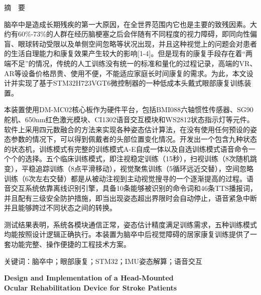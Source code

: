 
\begin{center}
{\heiti \husttitle}
\end{center}

\vskip 14pt

\begin{center}
{\heiti 摘\ \ 要}
\end{center}

\vskip 14pt

{\songti
脑卒中是造成长期残疾的第一大原因，在全世界范围内它也是主要的致残因素。大约有60\%-73\%的人群在经历脑梗塞之后会伴随有不同程度的视力障碍，即同向性偏盲、眼球转动受限以及单侧空间忽略等状况出现，并且这种视觉上的问题会对患者的生活自理能力和康复效果产生较大的影响[1-4]。但是现有的康复手段存在着“两端不足”的情况，传统的人工训练没有统一的标准和量化的过程记录，高端的VR、AR等设备价格昂贵、使用不便，不能适应家庭长时间康复的需求。为此，本文设计并实现了基于STM32H723VGT6微控制器的一种低成本头戴式眼部康复训练装置。

本装置使用DM-MC02核心板作为硬件平台，包括BMI088六轴惯性传感器、SG90舵机、650nm红色激光模块、CI1302语音交互模块和WS2812状态指示灯等元件。软件上采用四元数融合的方法来实现各种姿态估计算法，在没有使用任何预设的姿态参数的情况下，可以得到佩戴者的头部位置变化情况。开发出一个包含九种状态的状态机，训练模式有完整的训练模式A-E自成一体以及自选训练模式语音命令一个个的选择。五个临床训练模式，即注视稳定训练（15秒），扫视训练（8次随机跳变），平稳追踪训练（8点平滑移动），视觉聚焦训练（5循环远近交替），空间忽略训练（6次左右交替）都是从被动注视到主动视觉搜寻的一个逐渐提高的过程。语音交互系统依靠离线识别引擎，具备10条能够被识别的命令词和46条TTS播报词，并且配有三级安全防护措施，即当出现姿态超出界限时会自动停止，语音紧急中断并且能够跨过不同状态之间的转换。

测试结果表明，系统各模块通信正常，姿态估计精度满足训练需求，五种训练模式均能按照设计逻辑正确执行。本装置为脑卒中后视觉障碍的居家康复训练提供了一套功能完整、操作便捷的工程技术方案。
}

\vskip 14pt

\noindent
{\heiti 关键词：}{\songti 脑卒中；眼部康复；STM32；IMU姿态解算；语音交互}

\clearpage

\begin{center}
{\textbf{Design and Implementation of a Head-Mounted \\[2pt]
Ocular Rehabilitation Device for Stroke Patients}}
\end{center}

